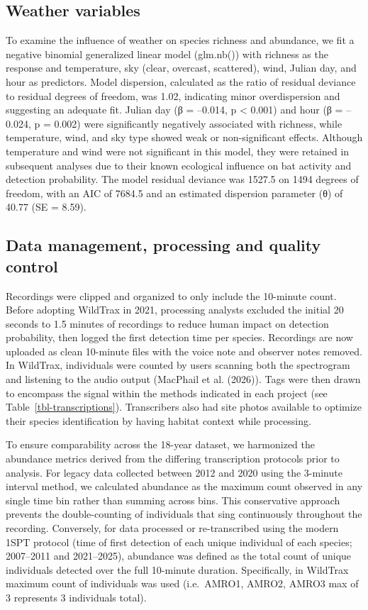 \documentclass[
  letterpaper,
  DIV=11,
  numbers=noendperiod]{scrartcl}
\begin{document}
\subsection{Weather variables}\label{weather-variables}

To examine the influence of weather on species richness and abundance,
we fit a negative binomial generalized linear model (glm.nb()) with
richness as the response and temperature, sky (clear, overcast,
scattered), wind, Julian day, and hour as predictors. Model dispersion,
calculated as the ratio of residual deviance to residual degrees of
freedom, was 1.02, indicating minor overdispersion and suggesting an
adequate fit. Julian day (β = --0.014, p \textless{} 0.001) and hour (β
= --0.024, p = 0.002) were significantly negatively associated with
richness, while temperature, wind, and sky type showed weak or
non-significant effects. Although temperature and wind were not
significant in this model, they were retained in subsequent analyses due
to their known ecological influence on bat activity and detection
probability. The model residual deviance was 1527.5 on 1494 degrees of
freedom, with an AIC of 7684.5 and an estimated dispersion parameter (θ)
of 40.77 (SE = 8.59).

\subsection{Data management, processing and quality
control}\label{data-management-processing-and-quality-control}

Recordings were clipped and organized to only include the 10-minute
count. Before adopting WildTrax in 2021, processing analysts excluded
the initial 20 seconds to 1.5 minutes of recordings to reduce human
impact on detection probability, then logged the first detection time
per species. Recordings are now uploaded as clean 10-minute files with
the voice note and observer notes removed. In WildTrax, individuals were
counted by users scanning both the spectrogram and listening to the
audio output (MacPhail et al. (2026)). Tags were then drawn to encompass
the signal within the methods indicated in each project (see
Table~\ref{tbl-transcriptions}). Transcribers also had site photos
available to optimize their species identification by having habitat
context while processing.

To ensure comparability across the 18-year dataset, we harmonized the
abundance metrics derived from the differing transcription protocols
prior to analysis. For legacy data collected between 2012 and 2020 using
the 3-minute interval method, we calculated abundance as the maximum
count observed in any single time bin rather than summing across bins.
This conservative approach prevents the double-counting of individuals
that sing continuously throughout the recording. Conversely, for data
processed or re-transcribed using the modern 1SPT protocol (time of
first detection of each unique individual of each species; 2007--2011
and 2021--2025), abundance was defined as the total count of unique
individuals detected over the full 10-minute duration. Specifically, in
WildTrax maximum count of individuals was used (i.e.~AMRO1, AMRO2, AMRO3
max of 3 represents 3 individuals total).
\end{document}
